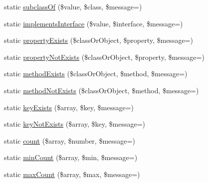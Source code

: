 \begin{DoxyCompactItemize}
\item 
static \mbox{\hyperlink{class_webmozart_1_1_assert_1_1_assert_a6db0aa06e88ea768cb657570579f82ce}{subclass\+Of}} (\$value, \$class, \$message=\textquotesingle{}\textquotesingle{})
\item 
static \mbox{\hyperlink{class_webmozart_1_1_assert_1_1_assert_a510e0c52d70cdc6d5d38f77fddb95bae}{implements\+Interface}} (\$value, \$interface, \$message=\textquotesingle{}\textquotesingle{})
\item 
static \mbox{\hyperlink{class_webmozart_1_1_assert_1_1_assert_a3889f87234a43fd8b3b2e573981f250e}{property\+Exists}} (\$class\+Or\+Object, \$property, \$message=\textquotesingle{}\textquotesingle{})
\item 
static \mbox{\hyperlink{class_webmozart_1_1_assert_1_1_assert_a93272f7ca1be7238439952e155d45e34}{property\+Not\+Exists}} (\$class\+Or\+Object, \$property, \$message=\textquotesingle{}\textquotesingle{})
\item 
static \mbox{\hyperlink{class_webmozart_1_1_assert_1_1_assert_a12445c43f65f6b32d4c8ff9b2af802ca}{method\+Exists}} (\$class\+Or\+Object, \$method, \$message=\textquotesingle{}\textquotesingle{})
\item 
static \mbox{\hyperlink{class_webmozart_1_1_assert_1_1_assert_a89eb06f654b380382f9fa231e3c432e6}{method\+Not\+Exists}} (\$class\+Or\+Object, \$method, \$message=\textquotesingle{}\textquotesingle{})
\item 
static \mbox{\hyperlink{class_webmozart_1_1_assert_1_1_assert_aea12c9b454962cdb8c46a5672c94e056}{key\+Exists}} (\$array, \$key, \$message=\textquotesingle{}\textquotesingle{})
\item 
static \mbox{\hyperlink{class_webmozart_1_1_assert_1_1_assert_ab6be7018de616cc6247319c64cf3c83b}{key\+Not\+Exists}} (\$array, \$key, \$message=\textquotesingle{}\textquotesingle{})
\item 
static \mbox{\hyperlink{class_webmozart_1_1_assert_1_1_assert_a42ed3e0539b9cc31451dc9b76d85a742}{count}} (\$array, \$number, \$message=\textquotesingle{}\textquotesingle{})
\item 
static \mbox{\hyperlink{class_webmozart_1_1_assert_1_1_assert_a2d08fca3ec29ec682c8b34f07fe36134}{min\+Count}} (\$array, \$min, \$message=\textquotesingle{}\textquotesingle{})
\item 
static \mbox{\hyperlink{class_webmozart_1_1_assert_1_1_assert_adeabb83a395b4a7d8dc04d6fef88071c}{max\+Count}} (\$array, \$max, \$message=\textquotesingle{}\textquotesingle{})
\item 

\end{DoxyCompactItemize}

